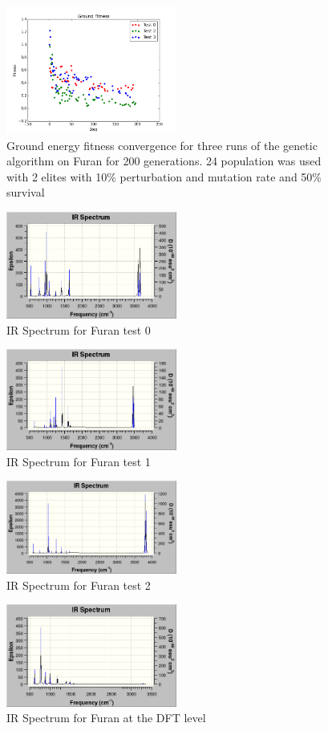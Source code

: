 \documentclass[11pt, twocolumn]{article}
\begin{document}
\begin{figure}[ground]
  \centering
  \includegraphics[width=0.5\textwidth]{furan_ground_convergence}
  \caption{Ground energy fitness convergence for three runs of the genetic algorithm on Furan for 200 generations.
  24 population was used with 2 elites with 10\% perturbation and mutation rate and 50\% survival}
\end{figure}

\begin{figure}[IR0]
  \centering
  \includegraphics[width=0.5\textwidth]{IR_0}
  \caption{IR Spectrum for Furan test 0}
\end{figure}

\begin{figure}[IR1]
  \centering
  \includegraphics[width=0.5\textwidth]{IR_1}
  \caption{IR Spectrum for Furan test 1}
\end{figure}

\begin{figure}[IR2]
  \centering
  \includegraphics[width=0.5\textwidth]{IR_2}
  \caption{IR Spectrum for Furan test 2}
\end{figure}

\begin{figure}[IR_DFT]
  \centering
  \includegraphics[width=0.5\textwidth]{IR_DFT}
  \caption{IR Spectrum for Furan at the DFT level}
\end{figure}
\end{document}
